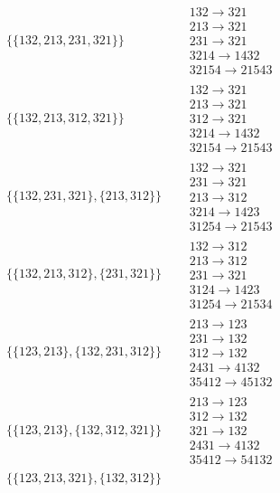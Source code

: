 \begin{tiny}
\begin{align}
\\
\{\{132, 213, 231, 321\}\}
\quad
&
\begin{matrix}
132 \to 321\\213 \to 321\\231 \to 321\\3214 \to 1432\\32154 \to 21543
\end{matrix}
\\
\{\{132, 213, 312, 321\}\}
\quad
&
\begin{matrix}
132 \to 321\\213 \to 321\\312 \to 321\\3214 \to 1432\\32154 \to 21543
\end{matrix}
\\
\{\{132, 231, 321\}, \{213, 312\}\}
\quad
&
\begin{matrix}
132 \to 321\\231 \to 321\\213 \to 312\\3214 \to 1423\\31254 \to 21543
\end{matrix}
\\
\{\{132, 213, 312\}, \{231, 321\}\}
\quad
&
\begin{matrix}
132 \to 312\\213 \to 312\\231 \to 321\\3124 \to 1423\\31254 \to 21534
\end{matrix}
\\
\{\{123, 213\}, \{132, 231, 312\}\}
\quad
&
\begin{matrix}
213 \to 123\\231 \to 132\\312 \to 132\\2431 \to 4132\\35412 \to 45132
\end{matrix}
\\
\{\{123, 213\}, \{132, 312, 321\}\}
\quad
&
\begin{matrix}
213 \to 123\\312 \to 132\\321 \to 132\\2431 \to 4132\\35412 \to 54132
\end{matrix}
\\
\{\{123, 213, 321\}, \{132, 312\}\}

\end{align}
\end{tiny}
